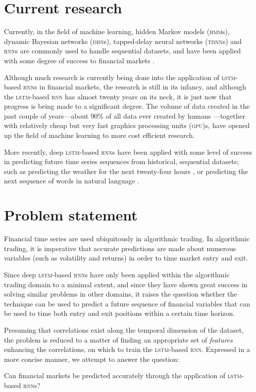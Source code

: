 \section{Current research}
Currently, in the field of machine learning, hidden Markov models
(\textsc{hmm}s), dynamic Bayesian networks (\textsc{dbn}s), tapped-delay neural
networks (\textsc{tdnn}s) and \textsc{rnn}s are commonly used to handle
sequential datasets, and have been applied with some degree of success to
financial markets \citep{saad1998,kita2012,zhang2004}.

Although much research is currently being done into the application of
\textsc{lstm}-based \textsc{rnn}s in financial markets, the research is still in
its infancy, and although the \textsc{lstm}-based \textsc{rnn} has almost twenty
years on its neck, it is just now that progress is being made to a significant
degree.  The volume of data created in the past couple of years---about 90\% of
all data ever created by humans \citep*{devakunchari2014}---together with
relatively cheap but very fast graphics processing units (\textsc{gpu})s, have
opened up the field of machine learning to more cost efficient research.

More recently, deep \textsc{lstm}-based \textsc{rnn}s have been applied with
some level of success in predicting future time series sequences from
historical, sequential datasets; such as predicting the weather for the next
twenty-four hours \citep*{zaytar2016}, or predicting the next sequence of words
in natural language \citep*{quoc2014}.

\section{Problem statement}
Financial time series are used ubiquitously in algorithmic trading.  In
algorithmic trading, it is imperative that accurate predictions are made about
numerous variables (such as volatility and returns) in order to time market
entry and exit.

Since deep \textsc{lstm}-based \textsc{rnn}s have only been applied within the
algorithmic trading domain to a minimal extent, and since they have shown great
success in solving similar problems in other domains, it raises the question
whether the technique can be used to predict a future sequence of financial
variables that can be used to time both entry and exit positions within a
certain time horizon.

Presuming that correlations exist along the temporal dimension of the dataset,
the problem is reduced to a matter of finding an appropriate set of
\textit{features} enhancing the correlations, on which to train the
\textsc{lstm}-based \textsc{rnn}.  Expressed in a more concise manner, we
attempt to answer the question:

Can financial markets be predicted accurately through the application of
\textsc{lstm}-based \textsc{rnn}s?
